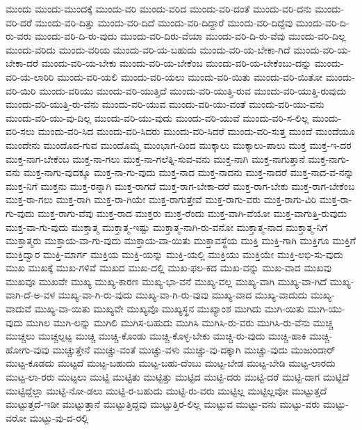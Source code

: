 {ಮುಂದು
ಮುಂದು-ಮುಂದಕ್ಕೆ
ಮುಂದು-ವರಿ
ಮುಂದು-ವರಿದ
ಮುಂದು-ವರಿ-ದಂತೆ
ಮುಂದು-ವರಿ-ದನು
ಮುಂದು-ವರಿ-ದರೆ
ಮುಂದು-ವರಿ-ದಿತ್ತು
ಮುಂದು-ವರಿ-ದಿದೆ
ಮುಂದು-ವರಿ-ದಿದ್ದಾರೆ
ಮುಂದು-ವರಿ-ದಿದ್ದೆವು
ಮುಂದು-ವರಿ-ದಿ-ರು-ವರು
ಮುಂದು-ವರಿ-ದಿ-ರು-ವುದು
ಮುಂದು-ವರಿ-ದಿರು-ವೆಯಾ
ಮುಂದು-ವರಿ-ದಿ-ರು-ವೆವು
ಮುಂದು-ವರಿ-ದಿಲ್ಲ
ಮುಂದು-ವರಿದು
ಮುಂದು-ವರಿಯ
ಮುಂದು-ವರಿ-ಯ-ಬಹುದು
ಮುಂದು-ವರಿ-ಯ-ಬೇಕಾ-ಗಿದೆ
ಮುಂದು-ವರಿ-ಯ-ಬೇಕಾ-ದರೆ
ಮುಂದು-ವರಿ-ಯ-ಬೇಕು
ಮುಂದು-ವರಿ-ಯ-ಬೇಕೆಂಬ
ಮುಂದು-ವರಿ-ಯ-ಬೇಕೆಂಬು-ದನ್ನು
ಮುಂದು-ವರಿ-ಯ-ಲಾರಿರಿ
ಮುಂದು-ವರಿ-ಯಲಿ
ಮುಂದು-ವರಿ-ಯಲು
ಮುಂದು-ವರಿ-ಯಿತು
ಮುಂದು-ವರಿ-ಯಿತೋ
ಮುಂದು-ವರಿ-ಯಿರಿ
ಮುಂದು-ವರಿಯು
ಮುಂದು-ವರಿ-ಯುತ್ತಿದೆ
ಮುಂದು-ವರಿ-ಯುತ್ತಿ-ರುವ
ಮುಂದು-ವರಿ-ಯುತ್ತಿ-ರುವುದು
ಮುಂದು-ವರಿ-ಯುತ್ತಿ-ರು-ವೆನು
ಮುಂದು-ವರಿ-ಯುವ
ಮುಂದು-ವರಿ-ಯು-ವಂತೆ
ಮುಂದು-ವರಿ-ಯು-ವನು
ಮುಂದು-ವರಿ-ಯು-ವು-ದಿಲ್ಲ
ಮುಂದು-ವರಿ-ಯು-ವುದು
ಮುಂದು-ವರಿ-ಯುವೆ
ಮುಂದು-ವರಿ-ಸ-ಲಿಲ್ಲ
ಮುಂದು-ವರಿ-ಸಲು
ಮುಂದು-ವರಿ-ಸಿದ
ಮುಂದು-ವರಿ-ಸಿದರು
ಮುಂದು-ವರಿ-ಸಿದರೆ
ಮುಂದು-ವರಿ-ಸುತ್ತ
ಮುಂದೆ
ಮುಂದೆಯೂ
ಮುಂದೇನು
ಮುಂದೊದ-ಗುವ
ಮುಂದೊಮ್ಮೆ
ಮುಂಭಾಗ-ದಿಂದ
ಮುಕ್ಕಾಲು
ಮುಕ್ಕಾಲು-ಪಾಲು
ಮುಕ್ತ
ಮುಕ್ತ-ಇ-ದರ
ಮುಕ್ತ-ನಾಗ-ಬೇಕೆಂಬ
ಮುಕ್ತ-ನಾ-ಗಲು
ಮುಕ್ತ-ನಾ-ಗಲೆತ್ನಿ-ಸುವ-ವನು
ಮುಕ್ತ-ನಾಗಿ
ಮುಕ್ತ-ನಾಗುತ್ತಾನೆ
ಮುಕ್ತ-ನಾಗು-ವನು
ಮುಕ್ತ-ನಾಗು-ವುದಕ್ಕೂ
ಮುಕ್ತ-ನಾ-ಗು-ವುದು
ಮುಕ್ತ-ನಾದ
ಮುಕ್ತ-ನಾದನು
ಮುಕ್ತ-ನಾದರೆ
ಮುಕ್ತ-ನಾದ-ವ-ನನ್ನು
ಮುಕ್ತ-ನಿಗೆ
ಮುಕ್ತನು
ಮುಕ್ತ-ರನ್ನಾಗಿ
ಮುಕ್ತ-ರಾಗದೆ
ಮುಕ್ತ-ರಾಗ-ಬೇಕಾ-ದರೆ
ಮುಕ್ತ-ರಾಗ-ಬೇಕು
ಮುಕ್ತ-ರಾಗ-ಬೇಕೆಂಬ
ಮುಕ್ತ-ರಾ-ಗಲು
ಮುಕ್ತ-ರಾಗಿ
ಮುಕ್ತ-ರಾ-ಗಿಯೇ
ಮುಕ್ತ-ರಾಗುತ್ತೇವೆ
ಮುಕ್ತ-ರಾಗು-ವರು
ಮುಕ್ತ-ರಾಗು-ವಿರಿ
ಮುಕ್ತ-ರಾ-ಗು-ವುದು
ಮುಕ್ತ-ರಾಗು-ವೆವು
ಮುಕ್ತ-ರಾದ
ಮುಕ್ತರು
ಮುಕ್ತ-ರೆಂದು
ಮುಕ್ತ-ವಾಗಿ-ವೆಯೋ
ಮುಕ್ತ-ವಾಗುತ್ತಿ-ರುವುದು
ಮುಕ್ತ-ವಾ-ಗು-ವುದು
ಮುಕ್ತಾತ್ಮ
ಮುಕ್ತಾತ್ಮ-ಇಷ್ಟು
ಮುಕ್ತಾತ್ಮ-ನಾಗಿ-ರು-ವನೋ
ಮುಕ್ತಾತ್ಮ-ನಾದ
ಮುಕ್ತಾತ್ಮ-ನಿಗೆ
ಮುಕ್ತಾತ್ಮರು
ಮುಕ್ತಾಯ-ವಾ-ಗು-ವುದು
ಮುಕ್ತಾಯ-ವಾ-ಯಿತು
ಮುಕ್ತಾವಸ್ಥೆಯ
ಮುಕ್ತಿ
ಮುಕ್ತಿ-ಗಾಗಿ
ಮುಕ್ತಿಗೂ
ಮುಕ್ತಿಗೆ
ಮುಕ್ತಿದ್ವಾರ
ಮುಕ್ತಿ-ಮಾರ್ಗ
ಮುಕ್ತಿಯ
ಮುಕ್ತಿ-ಯನ್ನು
ಮುಕ್ತಿ-ಯಲ್ಲಿ
ಮುಕ್ತಿಯು
ಮುಕ್ತಿಯೇ
ಮುಕ್ತಿ-ಲಭಿ-ಸು-ವುದು
ಮುಖ
ಮುಖಕ್ಕೆ
ಮುಖ-ಗಳಿವೆ
ಮುಖದ
ಮುಖ-ದಲ್ಲಿ
ಮುಖ-ಫಲ-ಕದ
ಮುಖ-ವನ್ನು
ಮುಖ-ವಾದ
ಮುಖವು
ಮುಖವೂ
ಮುಖವೇ
ಮುಖ್ಯ
ಮುಖ್ಯ-ಕಾರಣ
ಮುಖ್ಯ-ಭಾ-ವನೆ
ಮುಖ್ಯ-ವಲ್ಲ
ಮುಖ್ಯ-ವಾಗಿ
ಮುಖ್ಯ-ವಾ-ಗಿದೆ
ಮುಖ್ಯ-ವಾಗಿ-ದೆ-ಅ-ವಳ
ಮುಖ್ಯ-ವಾ-ಗಿ-ರು-ವುದು
ಮುಖ್ಯ-ವಾ-ಗಿ-ರು-ವುವು
ಮುಖ್ಯ-ವಾದ
ಮುಖ್ಯ-ವಾದುದು
ಮುಖ್ಯ-ವಾದುವೆ
ಮುಖ್ಯ-ವಾ-ಯಿತು
ಮುಖ್ಯವೇ
ಮುಖ್ಯವೊ
ಮುಖ್ಯಸ್ಥನ
ಮುಖ್ಯಾಂಶ
ಮುಗಿದು
ಮುಗಿ-ಯಿತು
ಮುಗಿ-ಯು-ವುದು
ಮುಗಿಲ
ಮುಗಿ-ಲನ್ನು
ಮುಗಿಲಿ
ಮುಗಿಸ-ಬಹುದು
ಮುಗಿಸಿ
ಮುಗಿಸಿ-ರು-ವರು
ಮುಗಿಸಿ-ರು-ವೆನು
ಮುಚ್ಚ
ಮುಚ್ಚಲು
ಮುಚ್ಚಲ್ಪಟ್ಟ
ಮುಚ್ಚಿ
ಮುಚ್ಚಿ-ಕೊಂಡು
ಮುಚ್ಚಿ-ಕೊಳ್ಳ-ಬೇಕು
ಮುಚ್ಚಿ-ರು-ವುದು
ಮುಚ್ಚಿ-ಹಾಕಿ
ಮುಚ್ಚಿ-ಹೋಗು-ವುವು
ಮುಚ್ಚುತ್ತೇನೆ
ಮುಚ್ಚು-ವಂತೆ
ಮುಚ್ಚು-ವಳು
ಮುಚ್ಚು-ವು-ದಕ್ಕಾಗಿ
ಮುಚ್ಚು-ವುದು
ಮುಜುಂದಾರ್
ಮುಟ್ಟ-ಕೂಡದು
ಮುಟ್ಟದೆ
ಮುಟ್ಟ-ಬಹುದು
ಮುಟ್ಟ-ಬಹು-ದೆಂಬು
ಮುಟ್ಟ-ಬೇಡ
ಮುಟ್ಟ-ಬೇಡಿ
ಮುಟ್ಟ-ಲಾರದು
ಮುಟ್ಟ-ಲಾ-ರರು
ಮುಟ್ಟಲು
ಮುಟ್ಟಿ
ಮುಟ್ಟಿತು
ಮುಟ್ಟಿತ್ತು
ಮುಟ್ಟಿದ
ಮುಟ್ಟಿ-ದರು
ಮುಟ್ಟಿ-ದರೆ
ಮುಟ್ಟಿ-ದಾಗ
ಮುಟ್ಟಿದೆ
ಮುಟ್ಟಿದ್ದೆಲ್ಲಾ
ಮುಟ್ಟಿ-ನೋ-ಡಲು
ಮುಟ್ಟಿ-ರ-ಬಹುದು
ಮುಟ್ಟಿ-ರು-ವರು
ಮುಟ್ಟಿಲ್ಲ
ಮುಟ್ಟಿಲ್ಲವೋ
ಮುಟ್ಟುತ್ತದೆ
ಮುಟ್ಟುತ್ತದೆ-ಇಡೀ
ಮುಟ್ಟುತ್ತಾನೆ
ಮುಟ್ಟುತ್ತಿದ್ದವು
ಮುಟ್ಟುತ್ತಿರ-ಲಿಲ್ಲ
ಮುಟ್ಟುವ
ಮುಟ್ಟು-ವನು
ಮುಟ್ಟು-ವರು
ಮುಟ್ಟು-ವರೋ
ಮುಟ್ಟು-ವು-ದ-ರಲ್ಲಿ
}

